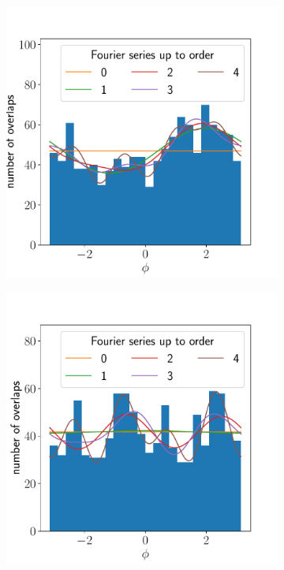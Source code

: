 \documentclass{article}
\begin{document}
\begin{figure}[ht]
\begin{subfigure}{0.24\linewidth}
		\caption{}
		\label{fig:isotropyhistvectra1edges}
	\end{subfigure}
	\begin{subfigure}{0.24\linewidth}
		\includegraphics[width=\linewidth]{isotropy-histogram-JHUVectra-4-corners}
		\caption{}
		\label{fig:isotropyhistvectra4corners}
	\end{subfigure}
	\begin{subfigure}{0.24\linewidth}
		\includegraphics[width=\linewidth]{isotropy-histogram-JHUVectra-3-corners}

\end{subfigure}
\end{figure}
\end{document}
